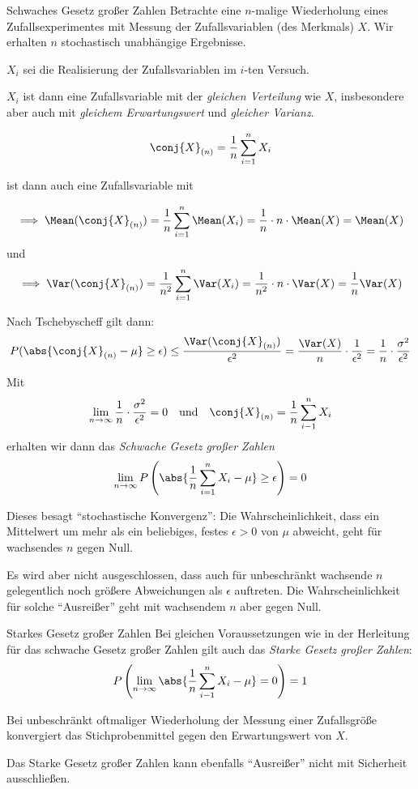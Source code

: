 \begin{defi}{Schwaches Gesetz großer Zahlen}
    Betrachte eine $n$-malige Wiederholung eines Zufallsexperimentes mit Messung der Zufallsvariablen (des Merkmals) $X$.
    Wir erhalten $n$ stochastisch unabhängige Ergebnisse.

    $X_i$ sei die Realisierung der Zufallsvariablen im $i$-ten Versuch.

    $X_i$ ist dann eine Zufallsvariable mit der \emph{gleichen Verteilung} wie $X$, insbesondere aber auch mit \emph{gleichem Erwartungswert} und \emph{gleicher Varianz}.

    \[
        \conj{X}_{(n)} = \frac{1}{n} \sum_{i=1}^{n} X_i
    \]

    ist dann auch eine Zufallsvariable mit

    \[
        \implies \Mean(\conj{X}_{(n)}) = \frac{1}{n} \sum_{i=1}^{n} \Mean(X_i) = \frac{1}{n} \cdot n \cdot \Mean(X) = \Mean(X)
    \]
    und
    \[
        \implies \Var(\conj{X}_{(n)}) = \frac{1}{n^2} \sum_{i=1}^{n} \Var(X_i) = \frac{1}{n^2} \cdot n \cdot \Var(X) = \frac{1}{n} \Var(X)
    \]

    Nach Tschebyscheff gilt dann:
    \[
        P(\abs{\conj{X}_{(n)} - \mu} \geq \epsilon) \leq \frac{\Var(\conj{X}_{(n)})}{\epsilon^2} = \frac{\Var(X)}{n} \cdot \frac{1}{\epsilon^2} = \frac{1}{n} \cdot \frac{\sigma^2}{\epsilon^2}
    \]

    Mit
    \[
        \lim_{n\to\infty} \frac{1}{n} \cdot \frac{\sigma^2}{\epsilon^2} = 0 \quad \text{und} \quad \conj{X}_{(n)} = \frac{1}{n}\sum_{i-1}^{n} X_i
    \]
    erhalten wir dann das \emph{Schwache Gesetz großer Zahlen}
    \[
        \lim_{n\to\infty} P \left( \abs{\frac{1}{n} \sum_{i=1}^n X_i - \mu} \geq \epsilon \right) = 0
    \]

    Dieses besagt \enquote{stochastische Konvergenz}:
    Die Wahrscheinlichkeit, dass ein Mittelwert um mehr als ein beliebiges, festes $\epsilon > 0$ von $\mu$ abweicht, geht für wachsendes $n$ gegen Null.

    Es wird aber nicht ausgeschlossen, dass auch für unbeschränkt wachsende $n$ gelegentlich noch größere Abweichungen als $\epsilon$ auftreten.
    Die Wahrscheinlichkeit für solche \enquote{Ausreißer} geht mit wachsendem $n$ aber gegen Null.
\end{defi}

\begin{defi}{Starkes Gesetz großer Zahlen}
    Bei gleichen Voraussetzungen wie in der Herleitung für das schwache Gesetz großer Zahlen gilt auch das \emph{Starke Gesetz großer Zahlen}:
    \[
        P \left( \lim_{n\to\infty} \abs{\frac{1}{n} \sum_{i-1}^n X_i - \mu} = 0 \right) = 1
    \]

    Bei unbeschränkt oftmaliger Wiederholung der Messung einer Zufallsgröße konvergiert das Stichprobenmittel gegen den Erwartungswert von $X$.

    Das Starke Gesetz großer Zahlen kann ebenfalls \enquote{Ausreißer} nicht mit Sicherheit ausschließen.
\end{defi}

